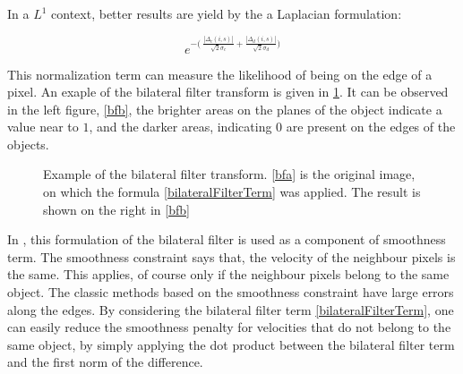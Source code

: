 \documentclass[12pt,a4paper,twoside]{report}
\begin{document}
{In a $L^1$ context, better results are yield by the a Laplacian formulation:

\begin{equation} \label{bilateralFilterTermLaplac}
e^{-\big(\ \frac{|\Delta_c(i,s)|}{\sqrt{2}\sigma_c}+ \frac{|\Delta_d(i,s)|}{\sqrt{2}\sigma_d}\big)}
\end{equation}


This normalization term can measure the likelihood of being on the edge of a pixel. An exaple of the bilateral filter transform is given in \ref{BFexaple}. It can be observed in the left figure, \ref{bfb}, the brighter areas on the planes of the object indicate a value near to $1$, and the darker areas, indicating $0$ are present on the edges of the objects.

\begin{figure} \label{BFexaple}
	\caption{Example of the bilateral filter transform. \ref{bfa} is the original image, on which the formula \ref{bilateralFilterTerm} was applied. The result is shown on the right in \ref{bfb}}
\end{figure}

In \cite{drulea2013}, this formulation of the bilateral filter is used as a component of smoothness term. The smoothness constraint says that, the velocity of the neighbour pixels is the same. This applies, of course only if the neighbour pixels belong to the same object. The classic methods based on the smoothness constraint have large errors along the edges. By considering the bilateral filter term \ref{bilateralFilterTerm}, one can easily reduce the smoothness penalty for velocities that do not belong to the same object, by simply applying the dot product between the bilateral filter term and the first norm of the difference. 

}
\end{document}
